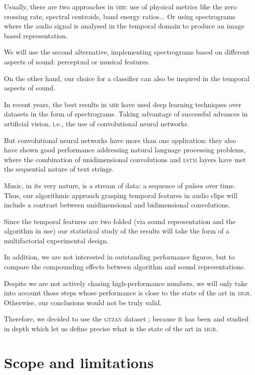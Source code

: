Usually, there are two approaches in \textsc{mir}: use of physical metrics \citep{22} like the zero crossing rate, spectral centroids, band energy ratios... Or using spectrograms \citep{45} where the audio signal is analysed in the temporal domain to produce an image based representation.

We will use the second alternative, implementing spectrograms based on different aspects of sound: perceptual or musical features.

On the other hand, our choice for a classifier can also be inspired in the temporal aspects of sound.

In recent years, the best results in \textsc{mir} have used deep learning techniques over datasets in the form of spectrograms. Taking advantage of successful advances in artificial vision, i.e., the use of convolutional neural networks.

But convolutional neural networks have more than one application: they also have shown good performance addressing natural language processing problems, where the combination of unidimensional convolutions and \textsc{lstm} layers have met the sequential nature of text strings.

Music, in its very nature, is a stream of data: a sequence of pulses over time. Thus, our algorithmic approach grasping temporal features in audio clips will include a contrast between unidimensional and bidimensional convolutions.

Since the temporal features are two folded (via sound representation and the algorithm in use) our statistical study of the results will take the form of a multifactorial experimental design.

In addition, we are not interested in outstanding performance figures, but to compare the compounding effects between algorithm and sound representations.

Despite we are not actively chasing high-performance numbers, we will only take into account those steps whose performance is close to the state of the art in \textsc{\textsc{mgr}}. Otherwise, our conclusions would not be truly valid.

Therefore, we decided to use the \textsc{gtzan} dataset \citep{gtzan}; because it has been and studied in depth which let us define precise what is the state of the art in \textsc{\textsc{mgr}}.

\section{Scope and limitations}

